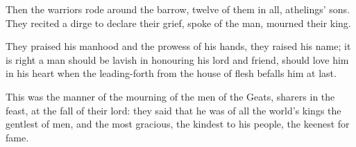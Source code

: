 \documentclass[a4paper]{article}
\begin{document}
{Then the warriors rode around the barrow,
twelve of them in all, athelings’ sons.
They recited a dirge to declare their grief,
spoke of the man, mourned their king.

They praised his manhood and the prowess of his hands,
they raised his name; it is right a man
should be lavish in honouring his lord and friend,
should love him in his heart when the leading-forth
from the house of flesh befalls him at last.

This was the manner of the mourning of the men of the Geats,
sharers in the feast, at the fall of their lord:
they said that he was of all the world’s kings
the gentlest of men, and the most gracious,
the kindest to his people, the keenest for fame.

}
\end{document}
